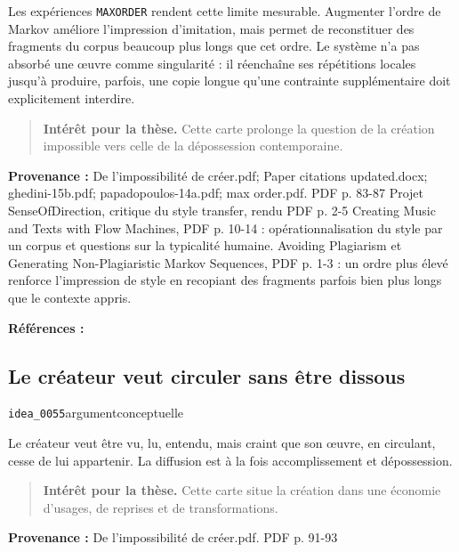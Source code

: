 \documentclass[10pt,a4paper]{article}
\begin{document}
Les expériences \texttt{MAXORDER} rendent cette limite mesurable. Augmenter l'ordre de Markov améliore l'impression d'imitation, mais permet de reconstituer des fragments du corpus beaucoup plus longs que cet ordre. Le système n'a pas absorbé une œuvre comme singularité : il réenchaîne ses répétitions locales jusqu'à produire, parfois, une copie longue qu'une contrainte supplémentaire doit explicitement interdire.

\begin{quote}
\textbf{Intérêt pour la thèse.} Cette carte prolonge la question de la création impossible vers celle de la dépossession contemporaine.
\end{quote}
{\footnotesize\color{metadata}\textbf{Provenance :} De l'impossibilité de créer.pdf; Paper citations updated.docx; ghedini-15b.pdf; papadopoulos-14a.pdf; max order.pdf. PDF p. 83-87 Projet SenseOfDirection, critique du style transfer, rendu PDF p. 2-5 Creating Music and Texts with Flow Machines, PDF p. 10-14 : opérationnalisation du style par un corpus et questions sur la typicalité humaine. Avoiding Plagiarism et Generating Non-Plagiaristic Markov Sequences, PDF p. 1-3 : un ordre plus élevé renforce l'impression de style en recopiant des fragments parfois bien plus longs que le contexte appris.\par}
{\footnotesize\color{metadata}\textbf{Références :} \parencite{ghedini2015flowmachines,papadopoulos2014avoiding,papadopoulos2016nonplagiaristic}\par}

\subsection{Le créateur veut circuler sans être dissous}
{\small\color{metadata} \texttt{idea\_0055}\quad\textbullet\quad argument\quad\textbullet\quad conceptuelle\par}

Le créateur veut être vu, lu, entendu, mais craint que son œuvre, en circulant, cesse de lui appartenir. La diffusion est à la fois accomplissement et dépossession.

\begin{quote}
\textbf{Intérêt pour la thèse.} Cette carte situe la création dans une économie d'usages, de reprises et de transformations.
\end{quote}
{\footnotesize\color{metadata}\textbf{Provenance :} De l'impossibilité de créer.pdf. PDF p. 91-93\par}
\end{document}
